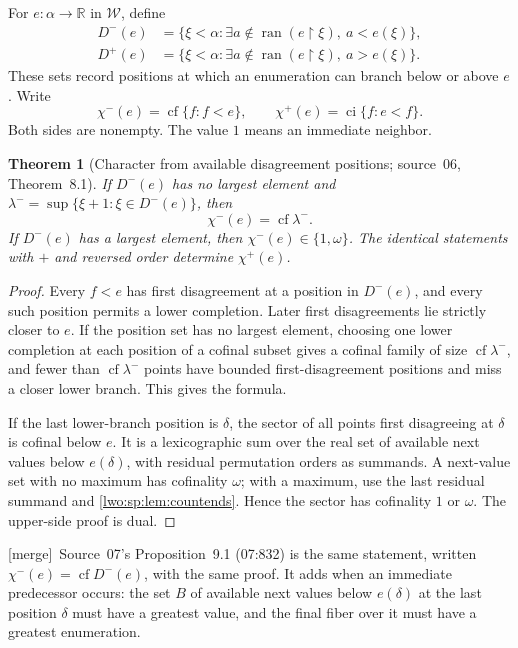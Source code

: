 \documentclass[11pt,a4paper]{article}
\newtheorem{theorem}{Theorem}[section]
\theoremstyle{definition}
\theoremstyle{remark}
\newcommand{\R}{\mathbb R}
\newcommand{\W}{\mathcal W}
\newcommand{\restr}{\mathbin{\upharpoonright}}
\newcommand{\ran}{\operatorname{ran}}
\newcommand{\cf}{\operatorname{cf}}
\newcommand{\ci}{\operatorname{ci}}
\newcommand{\chm}{\chi^-}
\newcommand{\chp}{\chi^+}
\newcommand{\merge}{\textsf{[merge]}}
\begin{document}
For $e:\alpha\to\R$ in $\W$, define
\begin{align*}
 D^-(e)&=\{\xi<\alpha:\exists a\notin\ran(e\restr\xi),\ a<e(\xi)\},\\
 D^+(e)&=\{\xi<\alpha:\exists a\notin\ran(e\restr\xi),\ a>e(\xi)\}.
\end{align*}
These sets record positions at which an enumeration can branch below or
above $e$. Write
\[
 \chm(e)=\cf\{f:f<e\},\qquad
 \chp(e)=\ci\{f:e<f\}.
\]
Both sides are nonempty. The value $1$ means an immediate neighbor.

\begin{theorem}[Character from available disagreement positions; source~06, Theorem~8.1]
\label{lwo:sp:thm:characterformula}
If $D^-(e)$ has no largest element and $\lambda^-=\sup\{\xi+1:\xi\in D^-(e)\}$,
then
\[
 \chm(e)=\cf\lambda^-.
\]
If $D^-(e)$ has a largest element, then $\chm(e)\in\{1,\omega\}$. The identical
statements with $+$ and reversed order determine $\chp(e)$.
\end{theorem}
\begin{proof}
Every $f<e$ has first disagreement at a position in $D^-(e)$, and every such
position permits a lower completion. Later first disagreements lie strictly
closer to $e$. If the position set has no largest element, choosing one lower
completion at each position of a cofinal subset gives a cofinal family of size
$\cf\lambda^-$, and fewer than $\cf\lambda^-$ points have bounded
first-disagreement positions and miss a closer lower branch. This gives the
formula.

If the last lower-branch position is $\delta$, the sector of all points first
disagreeing at $\delta$ is cofinal below $e$. It is a lexicographic sum over
the real set of available next values below $e(\delta)$, with residual
permutation orders as summands. A next-value set with no maximum has
cofinality $\omega$; with a maximum, use the last residual summand and
\cref{lwo:sp:lem:countends}. Hence the sector has cofinality $1$ or $\omega$.
The upper-side proof is dual.
\end{proof}
\merge\ Source~07's Proposition~9.1 (07:832) is the same statement, written
$\chm(e)=\cf D^-(e)$, with the same proof. It adds when an immediate
predecessor occurs: the set $B$ of available next values below $e(\delta)$ at
the last position $\delta$ must have a greatest value, and the final fiber
over it must have a greatest enumeration.
\end{document}
